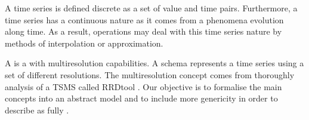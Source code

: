 A time series is defined discrete as a set of value and time
pairs. Furthermore, a time series has a continuous nature as it comes
from a phenomena evolution along time. As a result, 
operations may deal with this time series nature by methods of
interpolation or approximation.


A  is a  with multiresolution capabilities.  A
 schema represents a time series using a set of different
resolutions.  The multiresolution concept comes from thoroughly
analysis of a TSMS called RRDtool \cite{rrdtool}. Our objective is to
formalise the main concepts into an abstract model and to include more
genericity in order to describe  as fully .



